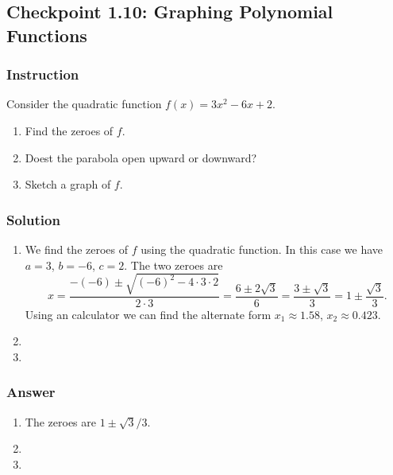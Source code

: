\subsection*{Checkpoint 1.10: Graphing Polynomial Functions}

\subsubsection*{Instruction}

Consider the quadratic function $ f(x) = 3x^2 -6x + 2 $.

\begin{enumerate}[label = (\alph*)]
  \item
    Find the zeroes of $ f $.
  \item
    Doest the parabola open upward or downward?
  \item
    Sketch a graph of $ f $.
\end{enumerate}

\subsubsection*{Solution}

\begin{enumerate}[label = (\alph*)]
  \item
    We find the zeroes of $ f $ using the quadratic function. In this case we have $ a = 3 $, $ b = -6 $, $ c = 2 $. The two zeroes are
    $$ \phantom{.}
    x = \frac{-(-6) \pm \sqrt{(-6)^2 - 4 \cdot 3 \cdot 2}}{2 \cdot 3} = \frac{6 \pm 2\sqrt{3}}{6} = \frac{3 \pm \sqrt{3}}{3} = 1 \pm \frac{\sqrt{3}}{3}
    .$$
    Using an calculator we can find the alternate form $ x_1 \approx 1.58 $, $ x_2 \approx 0.423 $.
  \item
  \item
\end{enumerate}

\subsubsection{Answer}

\begin{enumerate}[label = (\alph*)]
  \item
    The zeroes are $ 1 \pm {\sqrt{3}}/3 $.
  \item
  \item
\end{enumerate}
